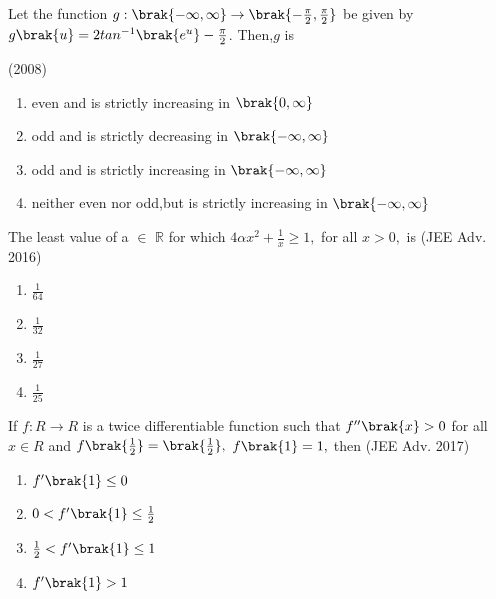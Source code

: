    \item 
	   Let the function $g:\brak{-\infty,\infty} \rightarrow  \brak{-\frac{\pi}{2},\frac{\pi}{2}}$ be given by $g\brak{u}= 2 tan^{-1}\brak{e^u}-\frac{\pi}{2}$. Then,$g$ is  
   
   \hfill(2008)
   \begin{enumerate}

	   \item even and is strictly increasing in $\brak{0,\infty}$
 
	   \item odd and is strictly decreasing in $\brak{-\infty,\infty}$


	   \item odd and is strictly increasing in $\brak{-\infty,\infty}$

	   \item neither even nor odd,but is strictly increasing in $\brak{-\infty,\infty}$ \\

   \end{enumerate}    

 
     \item 
	     The least value of a $\in$ $\mathbb{R}$ for which $4\alpha x^{2} + \frac{1}{x} \ge 1,$ for all $x>0,$ is 
     \hfill(JEE Adv. 2016)
     \begin{enumerate}
      \item $\frac{1}{64}$
      \item $\frac{1}{32}$
      \item $\frac{1}{27}$
      \item $\frac{1}{25}$\\
     \end{enumerate}
     
     \item
        If $f: R \rightarrow R$ is a twice differentiable function such that $f^{\prime\prime}\brak{x}>0$ for all $x \in R$ and $f\brak{\frac{1}{2}} = \brak{\frac{1}{2}},$ $f\brak{1}=1,$ then
     \hfill(JEE Adv. 2017) 

     \begin{enumerate}
	 \item $f^{\prime}\brak{1} \le 0$ 
	 \item $0<f^{\prime}\brak{1} \le \frac{1}{2}$
	 \item $\frac{1}{2} < f^{\prime}\brak{1}\le 1$ 
	 \item $f^{\prime}\brak{1} > 1$\\
    \end{enumerate}

